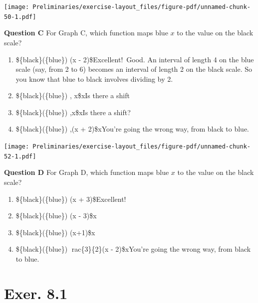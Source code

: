 \documentclass[
  letterpaper,
  DIV=11,
  numbers=noendperiod,
  oneside]{article}
\providecommand{\tightlist}{%
  \setlength{\itemsep}{0pt}\setlength{\parskip}{0pt}}\usepackage{longtable,booktabs,array}
\begin{document}
\begin{multicols}{2}
\texttt{[image: Preliminaries/exercise-layout\_files/figure-pdf/unnamed-chunk-50-1.pdf]}

\textbf{Question C} For Graph C, which function maps blue \(x\) to the
value on the black scale?

\begin{enumerate}
\def\labelenumi{\roman{enumi}.}
\tightlist
\item
  {\$\text\{black\}(\text\{blue\}) \equiv {}(x -
  2)\${Excellent!~Good. An interval of length 4 on the blue scale (say,
  from 2 to 6) becomes an interval of length 2 on the black scale. So
  you know that blue to black involves dividing by 2.}}\\
\item
  {\$\text\{black\}(\text\{blue\}) , x\${xIs there a shift}}\\
\item
  {\$\text\{black\}(\text\{blue\}) ,x\${xIs there a shift?}}\\
\item
  {\$\text\{black\}(\text\{blue\}) ,(x + 2)\${xYou're going the
  wrong way, from black to blue.}}
\end{enumerate}

\texttt{[image: Preliminaries/exercise-layout\_files/figure-pdf/unnamed-chunk-52-1.pdf]}

\textbf{Question D} For Graph D, which function maps blue \(x\) to the
value on the black scale?

\begin{enumerate}
\def\labelenumi{\roman{enumi}.}
\tightlist
\item
  {\$\text\{black\}(\text\{blue\}) \equiv {} (x +
  3)\${Excellent!~}}\\
\item
  {\$\text\{black\}(\text\{blue\}) \equiv {} (x - 3)\${x}}\\
\item
  {\$\text\{black\}(\text\{blue\}) \equiv {} (x+1)\${x}}\\
\item
  {\$\text\{black\}(\text\{blue\}) \equiv rac\{3\}\{2\}(x - 2)\${xYou're
  going the wrong way, from black to blue.}}
\end{enumerate}

\hypertarget{exer.-8.1}{%
\section*{Exer. 8.1}\label{exer.-8.1}}


\end{multicols}
\end{document}
